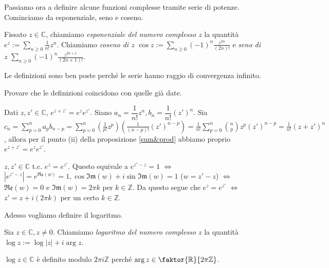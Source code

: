 Passiamo ora a definire alcune funzioni complesse tramite serie di potenze. Cominciamo da esponenziale, seno e coseno.

\begin{defn}
  Fissato $z \in \mathbb{C}$, chiamiamo \textit{esponenziale del numero complesso $z$} la quantità $\displaystyle e^z:=\sum_{n \ge 0} \frac{1}{n!}z^n$.
  Chiamiamo \textit{coseno di $z$} $\displaystyle \cos{z}:=\sum_{n \ge 0}(-1)^n\frac{z^{2n}}{(2n)!}$ e \textit{seno di $z$} $\displaystyle \sum_{n \ge 0}(-1)^n \frac{z^{2n+1}}{(2n+1)!}$.
\end{defn}

\begin{oss}
  Le definizioni sono ben poste perché le serie hanno raggio di convergenza infinito.
\end{oss}

\begin{exc}
  Provare che le definizioni coincidono con quelle già date.
\end{exc}

\begin{ex}
  Dati $z, z' \in \mathbb{C}$, $e^{z+z'}=e^ze^{z'}$. Siano $a_n=\dfrac{1}{n!}z^n, b_n=\dfrac{1}{n!}(z')^n$.
  Sia $\displaystyle c_n=\sum_{p=0}^n a_pb_{n-p}=\sum_{p=0}^n \left(\frac{1}{p!}z^p\right)\left(\frac{1}{(n-p)!}(z')^{n-p}\right)=\frac{1}{n!}\sum_{p=0}^n\binom{n}{p}z^p(z')^{n-p}=\frac{1}{n!}(z+z')^n$,
  allora per il punto (ii) della proposizione \ref{sum&prod} abbiamo proprio $e^{z+z'}=e^ze^{z'}$.
\end{ex}

\begin{oss}
  $z, z' \in \mathbb{C}$ t.c. $e^z=e^{z'}$. Questo equivale a $e^{z'-z}=1$ $\iff$ $|e^{z'-z}|=e^{\mathfrak{Re}(w)}=1, \cos{\mathfrak{Im}(w)}+i\sin{\mathfrak{Im}(w)}=1$ ($w=z'-z$) $\iff$ $\mathfrak{Re}(w)=0$ e $\mathfrak{Im}(w)=2\pi k$ per $k \in \mathbb{Z}$.
  Da questo segue che $e^z=e^{z'}$ $\iff$ $z'=z+i(2\pi k)$ per un certo $k \in \mathbb{Z}$.
\end{oss}

Adesso vogliamo definire il logaritmo.

\begin{defn}
  Sia $z \in \mathbb{C}, z \not=0$. Chiamiamo \textit{logaritmo del numero complesso $z$} la quantità $\log{z}:=\log{|z|}+i\arg{z}$.
\end{defn}

\begin{oss}
  $\log{z} \in \mathbb{C}$ è definito modulo $2\pi i \mathbb{Z}$ perché $\arg{z} \in \faktor{\mathbb{R}}{2\pi \mathbb{Z}}$.
\end{oss}

